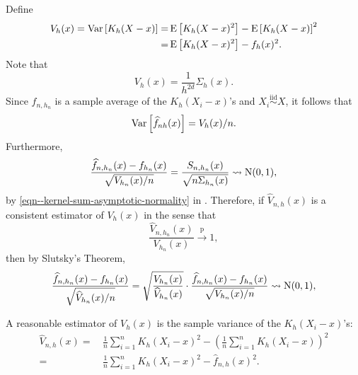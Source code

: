 Define
\begin{equation*}
  \begin{split}
    V_{h} (x) = \mathrm{Var} \left[ K_{h} (X - x) \right] =
    & \, \mathrm{E} \left[ K_{h} (X - x)^{2} \right] - \mathrm{E} \left[ K_{h} (X - x)
    \right]^{2} \\
    =
    & \, \mathrm{E} \left[ K_{h} (X - x)^{2} \right] - f_{h} (x)^{2}.
  \end{split}
\end{equation*}
Note that
\begin{equation*}
  V_{h} (x) = \frac{1}{h^{2 d}} \Sigma_{h} (x).
\end{equation*}
Since \(\widehat{f}_{n, h_{n}}\) is a sample average of the \(K_{h} \left( X_{i}
- x \right)\)'s and \(X_{i} \overset{\mathrm{iid}}{\sim} X\), it follows that
\begin{equation*}
  \mathrm{Var} \left[ \widehat{f}_{n h} (x) \right] = V_{h} (x) / n.
\end{equation*}
Furthermore,
\begin{equation*}
  \frac{\widehat{f}_{n, h_{n}} (x) - f_{h_{n}} (x)}{\sqrt{V_{h_{n}} (x) / n}} =
  \frac{S_{n, h_{n}} (x)}{\sqrt{n \Sigma_{h_{n}} (x)}} \rightsquigarrow \mathrm{N} (0,
  1),
\end{equation*}
by \eqref{eqn--kernel-sum-asymptotic-normality} in
.
Therefore, if \(\widehat{V}_{n, h} (x)\) is a consistent estimator of \(V_{h}
(x)\) in the sense that
\begin{equation*}
  \frac{\widehat{V}_{n, h_{n}} (x)}{V_{h_{n}} (x)} \overset{\mathrm{p}}{\to} 1,
\end{equation*}
then by Slutsky's Theorem,
\begin{equation*}
  \frac{\widehat{f}_{n, h_{n}} (x) - f_{h_{n}} (x)}{\sqrt{\widehat{V}_{h_{n}}
  (x) / n}} = \sqrt{\frac{V_{h_{n}} (x)}{\widehat{V}_{h_{n}} (x)}} \cdot
  \frac{\widehat{f}_{n, h_{n}} (x) - f_{h_{n}} (x)}{\sqrt{V_{h_{n}} (x) / n}}
\rightsquigarrow \mathrm{N} (0, 1),
\end{equation*}

A reasonable estimator of \(V_{h} (x)\) is the sample variance of the \(K_{h}
\left( X_{i} - x \right)\)'s:
\begin{equation}
  \begin{split}
    \widehat{V}_{n, h} (x) =
    & \, \frac{1}{n} \sum_{i = 1}^{n} K_{h} \left( X_{i} - x \right)^{2} -
    \left( \frac{1}{n} \sum_{i = 1}^{n} K_{h} \left( X_{i} - x \right)
    \right)^{2} \\
    =
    & \, \frac{1}{n} \sum_{i = 1}^{n} K_{h} \left( X_{i} - x \right)^{2} -
    \widehat{f}_{n, h} (x)^{2}.
  \end{split}
\end{equation}


